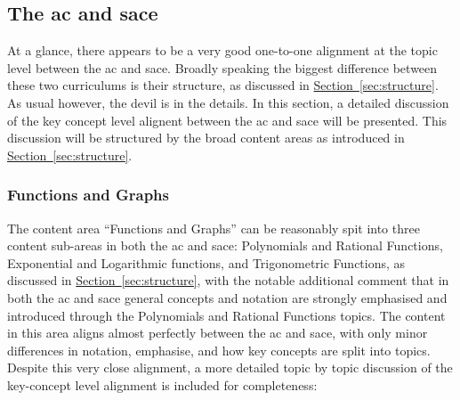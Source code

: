\documentclass[twoside,12pt,a4paper]{report}
\newcommand{\refsec}[1]{\hyperref[sec:#1]{Section~\ref{sec:#1}}}
\begin{document}
\subsection{The \gls{ac} and \gls{sace}}

At a glance, there appears to be a very good one-to-one alignment at the topic level between the \gls{ac} and \gls{sace}. Broadly speaking the biggest difference between these two curriculums is their structure, as discussed in \refsec{structure}. As usual however, the devil is in the details. In this section, a detailed discussion of the key concept level alignent between the \gls{ac} and \gls{sace} will be presented. This discussion will be structured by the broad content areas as introduced in 
\refsec{structure}.

\subsubsection{Functions and Graphs}

The content area ``Functions and Graphs'' can be reasonably spit into three content sub-areas in both the \gls{ac} and \gls{sace}: Polynomials and Rational Functions, Exponential and Logarithmic functions, and Trigonometric Functions, as discussed in \refsec{structure}, with the notable additional comment that in both the \gls{ac} and \gls{sace} general concepts and notation are strongly emphasised and introduced through the Polynomials and Rational Functions topics. The content in this area aligns almost perfectly between the \gls{ac} and \gls{sace}, with only minor differences in notation, emphasise, and how key concepts are split into topics. Despite this very close alignment, a more detailed topic by topic discussion of the key-concept level alignment is included for completeness:
\end{document}
